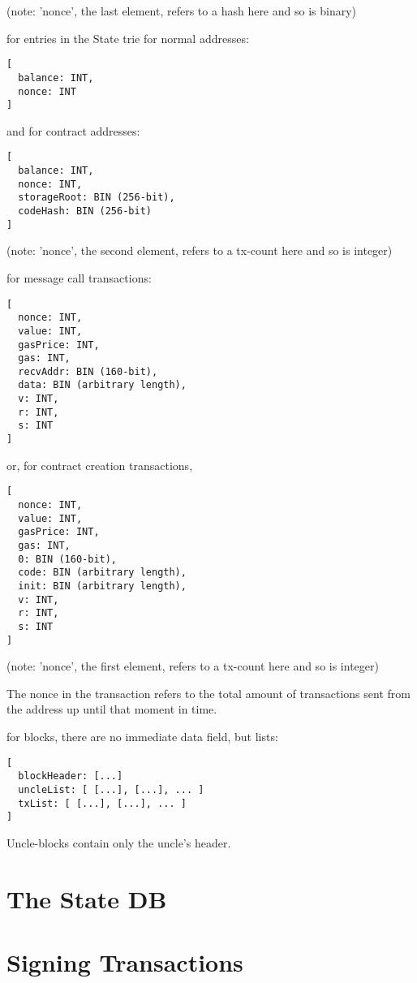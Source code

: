 \documentclass[9pt,oneside]{amsart}
\begin{document}
\begin{multicols}{2}
(note: 'nonce', the last element, refers to a hash here and so is binary)

for entries in the State trie for normal addresses:
\begin{verbatim}
[
  balance: INT,
  nonce: INT
]
\end{verbatim}

and for contract addresses:
\begin{verbatim}
[
  balance: INT,
  nonce: INT,
  storageRoot: BIN (256-bit),
  codeHash: BIN (256-bit)
]
\end{verbatim}

(note: 'nonce', the second element, refers to a tx-count here and so is integer)

for message call transactions:

\begin{verbatim}
[
  nonce: INT,
  value: INT,
  gasPrice: INT,
  gas: INT,
  recvAddr: BIN (160-bit),
  data: BIN (arbitrary length),
  v: INT,
  r: INT,
  s: INT
]
\end{verbatim}

or, for contract creation transactions,

\begin{verbatim}
[
  nonce: INT,
  value: INT,
  gasPrice: INT,
  gas: INT,
  0: BIN (160-bit),
  code: BIN (arbitrary length),
  init: BIN (arbitrary length),
  v: INT,
  r: INT,
  s: INT
]
\end{verbatim}

(note: 'nonce', the first element, refers to a tx-count here and so is integer)

The nonce in the transaction refers to the total amount of transactions sent from the address up until that moment in time.

for blocks, there are no immediate data field, but lists:

\begin{verbatim}
[
  blockHeader: [...]
  uncleList: [ [...], [...], ... ]
  txList: [ [...], [...], ... ]
]
\end{verbatim}

Uncle-blocks contain only the uncle's header.

\section{The State DB}\label{app:state}

\section{Signing Transactions}\label{app:signing}


\end{multicols}
\end{document}
